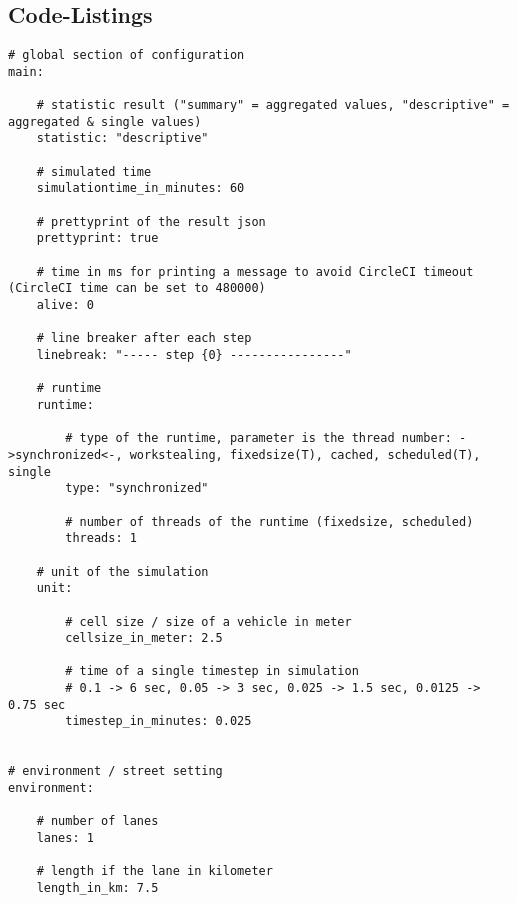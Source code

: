 \newpage

\subsection*{Code-Listings}

\begin{lstlisting}[style=asl, 
                   keywords={cellsize_in_meter,timestep_in_minutes,simulationtime_in_minutes,length_in_km,lanes}, 
                   keywords={[2]count,viewrange,speed,acceleration,deceleration}, 
                   keywords={[3]}, 
                   caption={Scenariovereinbarung},
                   label={lst:scenariofile}]      
# global section of configuration
main:

    # statistic result ("summary" = aggregated values, "descriptive" = aggregated & single values)
    statistic: "descriptive"

    # simulated time
    simulationtime_in_minutes: 60

    # prettyprint of the result json
    prettyprint: true

    # time in ms for printing a message to avoid CircleCI timeout (CircleCI time can be set to 480000)
    alive: 0

    # line breaker after each step
    linebreak: "----- step {0} ----------------"

    # runtime
    runtime:

        # type of the runtime, parameter is the thread number: ->synchronized<-, workstealing, fixedsize(T), cached, scheduled(T), single
        type: "synchronized"

        # number of threads of the runtime (fixedsize, scheduled)
        threads: 1

    # unit of the simulation
    unit:

        # cell size / size of a vehicle in meter
        cellsize_in_meter: 2.5

        # time of a single timestep in simulation
        # 0.1 -> 6 sec, 0.05 -> 3 sec, 0.025 -> 1.5 sec, 0.0125 -> 0.75 sec
        timestep_in_minutes: 0.025


# environment / street setting
environment:

    # number of lanes
    lanes: 1

    # length if the lane in kilometer
    length_in_km: 7.5



\end{lstlisting}
